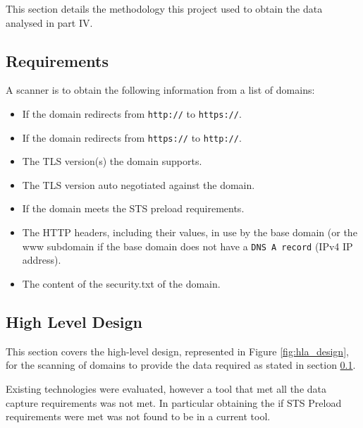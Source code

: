 \documentclass{mscreport}
\begin{document}
This section details the methodology this project used to obtain the data analysed in part IV.

\subsection{Requirements}
\label{subsection:requirements}

A scanner is to obtain the following information from a list of domains:

\begin{itemize}
	\setlength\itemsep{0.1em}
    \item If the domain redirects from \texttt{http://} to \texttt{https://}.
    \item If the domain redirects from \texttt{https://} to \texttt{http://}.
    \item The TLS version(s) the domain supports.
    \item The TLS version auto negotiated against the domain.
    \item If the domain meets the STS preload requirements.
    \item The HTTP headers, including their values, in use by the base domain (or the www subdomain if the base domain does not have a \texttt{DNS A record} (IPv4 IP address).
    \item The content of the security.txt of the domain.
\end{itemize}

\subsection{High Level Design}
\label{subsection:hld}

This section covers the high-level design, represented in Figure \ref{fig:hla_design}, for the scanning of domains to provide the data required as stated in section
\ref{subsection:requirements}.

\vspace{0.3cm} \noindent
Existing technologies were evaluated, however a tool that met all the data capture requirements was not met. In particular obtaining the if STS Preload requirements were met was not found to be in a current tool.

\end{document}
